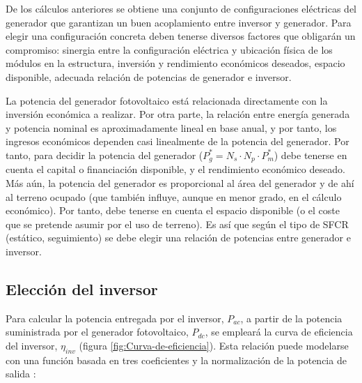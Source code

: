De los cálculos anteriores se obtiene una conjunto de configuraciones eléctricas
del generador que garantizan un buen acoplamiento entre inversor y
generador. Para elegir una configuración concreta deben tenerse diversos
factores que obligarán un compromiso: sinergia entre la configuración
eléctrica y ubicación física de los módulos en la estructura, inversión
y rendimiento económicos deseados, espacio disponible, adecuada relación
de potencias de generador e inversor.

La potencia del generador fotovoltaico está relacionada directamente
con la inversión económica a realizar. Por otra parte, la relación
entre energía generada y potencia nominal es aproximadamente lineal
en base anual, y por tanto, los ingresos económicos dependen casi
linealmente de la potencia del generador. Por tanto, para decidir
la potencia del generador ($P_{g}^{*}=N_{s}\cdot N_{p}\cdot
P_{m}^{*}$)
debe tenerse en cuenta el capital o financiación disponible, y el
rendimiento económico deseado. Más aún, la potencia del generador
es proporcional al área del generador y de ahí al terreno ocupado
(que también influye, aunque en menor grado, en el cálculo económico).
Por tanto, debe tenerse en cuenta el espacio disponible (o el coste
que se pretende asumir por el uso de terreno). Es así que según el
tipo de SFCR (estático, seguimiento) se debe elegir una relación de
potencias entre generador e inversor. 


\subsection{Elección del inversor}
\label{sec:curva-eficiencia-inversor}

Para calcular la potencia entregada por el inversor, $P_{ac}$,
a partir de la potencia suministrada por el generador fotovoltaico,
$P_{dc}$, se empleará la curva de eficiencia del inversor, $\eta_{inv}$
(figura \ref{fig:Curva-de-eficiencia}). Esta relación puede modelarse
con una función basada en tres coeficientes y la normalización de
la potencia de salida \cite{Jantsch.Schmidt.ea1992}:

